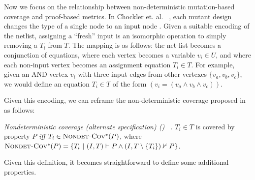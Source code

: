 \fi

\iffalse
Now we focus on the relationship between non-deterministic mutation-based coverage and proof-based metrics. In Chockler et. al.
~\cite{chockler2010coverage},
each mutant design changes the type of a single node to an input node .
Given a suitable encoding of the netlist, assigning a ``fresh'' input is an isomorphic operation to simply removing a $T_i$ from $T$. The mapping is as follows: the net-list becomes a conjunction
of equations, where each vertex becomes a variable $v_i \in U$, and where each non-input vertex becomes an assignment equation $T_i \in T$.
For example, given an AND-vertex $v_i$ with three input edges from other vertexes $\{v_a, v_b, v_c\}$, we would define an equation $T_i \in T$ of the form $(v_i = (v_a \wedge v_b \wedge v_c))$.
%

Given this encoding, we can reframe the non-deterministic coverage proposed in \cite{chockler2010coverage} as follows:

\begin{definition} {\emph{Nondeterministic coverage (alternate specification) (\nondetcovalt) ~\cite{chockler2010coverage}.} }
\label{def:non-det-2}
$T_i \in T$ is covered by property $P$ \emph{iff} $T_i \in \text{\sc Nondet-Cov$^{*}$} (P)$, where
$\text{\sc Nondet-Cov$^{*}$} (P) = \{T_i~|~ (I, T) \vdash P \wedge (I, T \setminus \{T_i\}) \nvdash P\}$.
\end{definition}
\noindent Given this definition, it becomes straightforward to define some additional properties.

